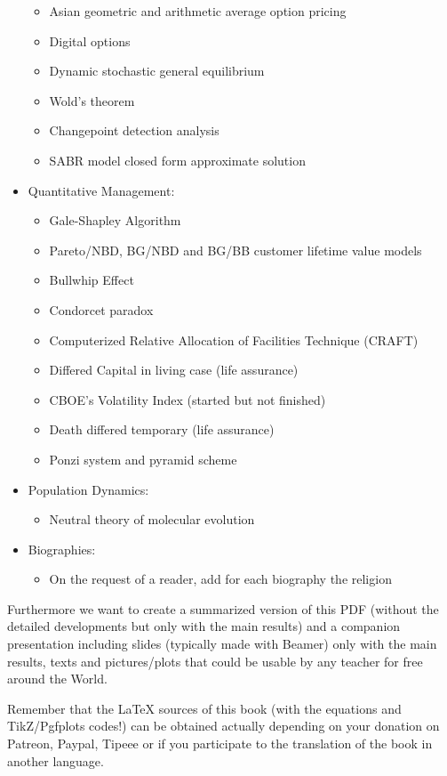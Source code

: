 \begin{itemize}
\begin{itemize}
				\item Asian geometric and arithmetic average option pricing
				\item Digital options
				\item Dynamic stochastic general equilibrium
				\item Wold's theorem
				\item Changepoint detection analysis
				\item SABR model closed form approximate solution
			\end{itemize}	
		\item Quantitative Management: 
			\begin{itemize}
				\item Gale-Shapley Algorithm
				\item Pareto/NBD, BG/NBD and BG/BB customer lifetime value models
				\item Bullwhip Effect
				\item Condorcet paradox	
				\item Computerized Relative Allocation of Facilities Technique (CRAFT)
				\item Differed Capital in living case (life assurance)
				\item CBOE's Volatility Index (started but not finished)
				\item Death differed temporary (life assurance)
				\item Ponzi system and pyramid scheme
			\end{itemize}
		\item Population Dynamics: 
			\begin{itemize}
				\item Neutral theory of molecular evolution
			\end{itemize}
		\item Biographies: 
			\begin{itemize}
				\item On the request of a reader, add for each biography the religion
			\end{itemize}
	\end{itemize}
	Furthermore we want to create a summarized version of this PDF (without the detailed developments but only with the main results) and a companion presentation including slides (typically made with Beamer) only with the main results, texts and pictures/plots that could be usable by any teacher for free around the World.
	
	Remember that the \LaTeX{} sources of this book (with the equations and TikZ/Pgfplots codes!) can be obtained actually depending on your donation on Patreon, Paypal, Tipeee or if you participate to the translation of the book in another language.
	
